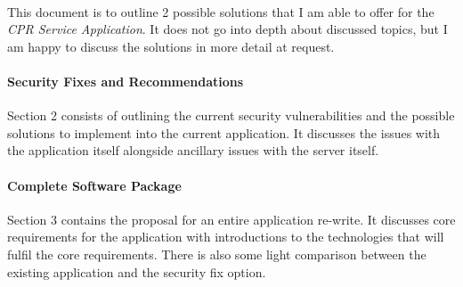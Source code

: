\paragraph{}
This document is to outline 2 possible solutions that I am able to offer for the \emph{CPR Service Application}.
It does not go into depth about discussed topics, but I am happy to discuss the solutions in more detail at request.

\paragraph{Security Fixes and Recommendations}
Section 2 consists of outlining the current security vulnerabilities and the possible solutions to implement into the current application.
It discusses the issues with the application itself alongside ancillary issues with the server itself.

\paragraph{Complete Software Package}
Section 3 contains the proposal for an entire application re-write.
It discusses core requirements for the application with introductions to the technologies that will fulfil the core requirements.
There is also some light comparison between the existing application and the security fix option.